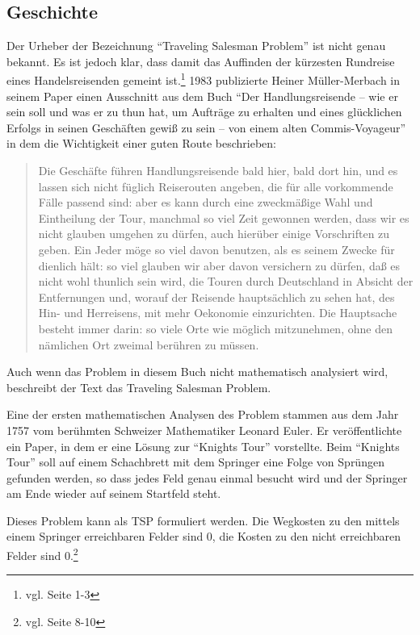 \documentclass[a4paper]{article}
\begin{document}
\subsection{Geschichte}
Der Urheber der Bezeichnung "`Traveling Salesman Problem"' ist nicht genau bekannt. Es ist jedoch klar, dass damit das Auffinden der kürzesten Rundreise eines Handelsreisenden gemeint ist.\footnote{vgl. \cite{applegate06} Seite 1-3} 1983 publizierte Heiner Müller-Merbach in seinem Paper\cite{mueller83} einen Ausschnitt aus dem Buch "`Der Handlungsreisende – wie er sein soll und was er zu thun hat, um Aufträge zu erhalten und eines glücklichen Erfolgs in seinen Geschäften gewiß zu sein – von einem alten Commis-Voyageur"' in dem die Wichtigkeit einer guten Route beschrieben:  
\begin{quotation}
Die Geschäfte führen Handlungsreisende bald hier, bald dort hin, und es lassen sich nicht füglich Reiserouten angeben, die für alle vorkommende Fälle passend sind: aber es kann durch eine zweckmäßige Wahl und Eintheilung der Tour, manchmal so viel Zeit gewonnen werden, dass wir es nicht glauben umgehen zu dürfen, auch hierüber einige Vorschriften zu geben. Ein Jeder möge so viel davon benutzen, als es seinem Zwecke für dienlich hält: so viel glauben wir aber davon versichern zu dürfen, daß es nicht wohl thunlich sein wird, die Touren durch Deutschland in Absicht der Entfernungen und, worauf der Reisende hauptsächlich zu sehen hat, des Hin- und Herreisens, mit mehr Oekonomie einzurichten. Die Hauptsache besteht immer darin: so viele Orte wie möglich mitzunehmen, ohne den nämlichen Ort zweimal berühren zu müssen.
\end{quotation}

Auch wenn das Problem in diesem Buch nicht mathematisch analysiert wird, beschreibt der Text das Traveling Salesman Problem. 

Eine der ersten mathematischen Analysen des Problem stammen aus dem Jahr 1757 vom berühmten Schweizer Mathematiker Leonard Euler. Er veröffentlichte ein Paper, in dem er eine Lösung zur "`Knights Tour"' vorstellte. Beim "`Knights Tour"' soll auf einem Schachbrett mit dem Springer eine Folge von Sprüngen gefunden werden, so dass jedes Feld genau einmal besucht wird und der Springer am Ende wieder auf seinem Startfeld steht.

Dieses Problem kann als TSP formuliert werden. Die Wegkosten zu den mittels einem Springer erreichbaren Felder sind 0, die Kosten zu den nicht erreichbaren Felder sind 0.\footnote{vgl. \cite{applegate06} Seite 8-10}
\end{document}
